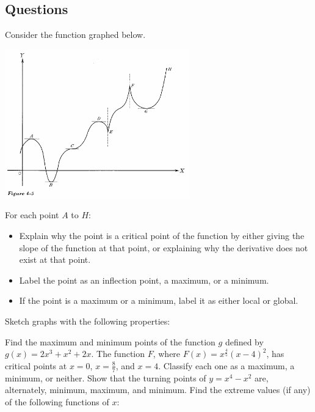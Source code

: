 \clearpage
\subsection*{Questions}
\begin{questions}
  \question Consider the function graphed below.
            \begin{center}
              \includegraphics[width=0.6\textwidth]{extrema}
            \end{center}
            For each point $ A $ to $ H $:
            \begin{itemize}
              \item Explain why the point is a critical point of the function by either giving the slope of the function at that point, or explaining
                    why the derivative does not exist at that point.
              \item Label the point as an inflection point, a maximum, or a minimum.
              \item If the point is a maximum or a minimum, label it as either local or global.
            \end{itemize}
  \question Sketch graphs with the following properties:
  \question Find the maximum and minimum points of the function $ g $ defined by $ g(x) = 2x^3 + x^2 + 2x $.
  \question The function $ F $, where $ F(x) = x^{\frac{4}{5}} (x - 4)^2 $, has critical points at $ x = 0 $, $x = \frac{8}{7}$, and $ x = 4 $. Classify
            each one as a maximum, a minimum, or neither.
  \question Show that the turning points of $ y = x^4 - x^2 $ are, alternately, minimum, maximum, and minimum.
  \question Find the extreme values (if any) of the following functions of $ x $:
    \begin{multicols}{2}
    \begin{parts}

\end{parts}
\end{multicols}
\end{questions}
